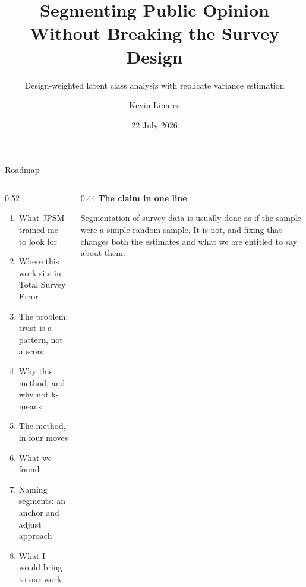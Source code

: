 \documentclass[
  ignorenonframetext,
  aspectratio=169,
]{beamer}
\title{Segmenting Public Opinion Without Breaking the Survey Design}
\subtitle{Design-weighted latent class analysis with replicate variance
estimation}
\author{Kevin Linares}
\date{22 July 2026}
\institute{Public Opinion Research}
\newcommand{\kicker}[1]{\par\noindent{\footnotesize\color{vteal}\textbf{\MakeUppercase{#1}}}\par\vspace{0.4em}}
\begin{document}
\frame{\titlepage}


\begin{frame}[shrink]{Roadmap}
\label{roadmap}
\kicker{the plan}

\vspace{0.4em}

\begin{columns}[T]
\begin{column}{0.52\textwidth}
\begin{enumerate}\itemsep2pt
  \item What JPSM trained me to look for
  \item Where this work sits in Total Survey Error
  \item The problem: trust is a pattern, not a score
  \item Why this method, and why not k-means
  \item The method, in four moves
  \item What we found
  \item Naming segments: an anchor and adjust approach
  \item What I would bring to our work
\end{enumerate}
\end{column}
\begin{column}{0.44\textwidth}
\small
\textbf{The claim in one line}

\vspace{0.4em}

Segmentation of survey data is usually done as if the sample were a simple random sample. It is not, and fixing that changes both the estimates and what we are entitled to say about them.
\end{column}
\end{columns}

\end{frame}
\end{document}
